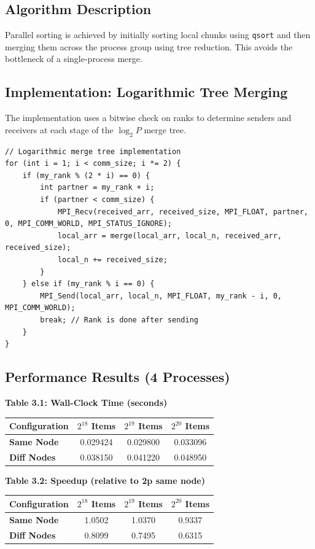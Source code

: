 \documentclass[11pt]{article}
\begin{document}
\subsection*{Algorithm Description}
Parallel sorting is achieved by initially sorting local chunks using \texttt{qsort} and then merging them across the process group using tree reduction. This avoids the bottleneck of a single-process merge.

\subsection*{Implementation: Logarithmic Tree Merging}
The implementation uses a bitwise check on ranks to determine senders and receivers at each stage of the $\log_2 P$ merge tree.

\begin{lstlisting}
// Logarithmic merge tree implementation
for (int i = 1; i < comm_size; i *= 2) {
    if (my_rank % (2 * i) == 0) {
        int partner = my_rank + i;
        if (partner < comm_size) {
            MPI_Recv(received_arr, received_size, MPI_FLOAT, partner, 0, MPI_COMM_WORLD, MPI_STATUS_IGNORE);
            local_arr = merge(local_arr, local_n, received_arr, received_size);
            local_n += received_size;
        }
    } else if (my_rank % i == 0) {
        MPI_Send(local_arr, local_n, MPI_FLOAT, my_rank - i, 0, MPI_COMM_WORLD);
        break; // Rank is done after sending
    }
}
\end{lstlisting}

\subsection*{Performance Results (4 Processes)}

\begin{center}
\textbf{Table 3.1: Wall-Clock Time (seconds)} \\
\begin{tabular}{@{}lccc@{}}
\toprule
Configuration & $2^{18}$ Items & $2^{19}$ Items & $2^{20}$ Items \\
\midrule
\textbf{Same Node} & 0.029424 & 0.029800 & 0.033096 \\
\textbf{Diff Nodes} & 0.038150 & 0.041220 & 0.048950 \\
\bottomrule
\end{tabular}
\end{center}

\begin{center}
\textbf{Table 3.2: Speedup (relative to 2p same node)} \\
\begin{tabular}{@{}lccc@{}}
\toprule
Configuration & $2^{18}$ Items & $2^{19}$ Items & $2^{20}$ Items \\
\midrule
\textbf{Same Node} & 1.0502 & 1.0370 & 0.9337 \\
\textbf{Diff Nodes} & 0.8099 & 0.7495 & 0.6315 \\
\bottomrule
\end{tabular}
\end{center}
\end{document}

